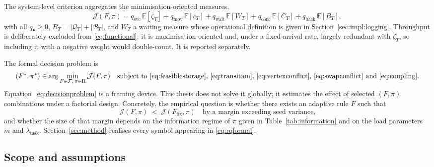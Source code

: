 \documentclass[../main.tex]{subfiles}
\begin{document}
The system-level criterion aggregates the minimisation-oriented measures,
\begin{equation}
  \mathcal{J}(F,\pi) = q_{\mathrm{svc}}\, \mathbb{E}[\bar{\zeta}_T]
                     + q_{\mathrm{mov}}\, \mathbb{E}[\bar{c}_T]
                     + q_{\mathrm{wait}}\, \mathbb{E}[W_T]
                     + q_{\mathrm{conc}}\, \mathbb{E}[C_T]
                     + q_{\mathrm{back}}\, \mathbb{E}[B_T],
  \label{eq:functional}
\end{equation}
with all $q_\bullet \ge 0$, $B_T = |\mathcal{Q}_T| + |\mathcal{B}_T|$, and $W_T$
a waiting measure whose operational definition is given in
Section~\ref{sec:impl:logging}. Throughput is deliberately excluded from
\eqref{eq:functional}: it is maximisation-oriented and, under a fixed arrival
rate, largely redundant with $\bar{\zeta}_T$, so including it with a negative
weight would double-count. It is reported separately.

The formal decision problem is
\begin{equation}
  (F^{\star}, \pi^{\star}) \in
  \arg\min_{F \in \mathcal{F},\, \pi \in \Pi} \mathcal{J}(F,\pi)
  \quad \text{subject to \eqref{eq:feasiblestorage}, \eqref{eq:transition},
  \eqref{eq:vertexconflict}, \eqref{eq:swapconflict} and \eqref{eq:coupling}.}
  \label{eq:decisionproblem}
\end{equation}
Equation~\eqref{eq:decisionproblem} is a framing device. This thesis does not
solve it globally; it estimates the effect of selected $(F,\pi)$ combinations
under a factorial design. Concretely, the empirical question is whether there
exists an adaptive rule $F$ such that
\begin{equation}
  \mathcal{J}(F, \pi) \;<\; \mathcal{J}(F_{\mathrm{fix}}, \pi)
  \quad \text{by a margin exceeding seed variance,}
  \label{eq:rqformal}
\end{equation}
and whether the size of that margin depends on the information regime of $\pi$
given in Table~\ref{tab:information} and on the load parameters $m$ and
$\lambda_{\mathrm{task}}$. Section~\ref{sec:method} realises every symbol
appearing in \eqref{eq:rqformal}.

\subsection{Scope and assumptions}
\label{sec:pf:scope}
\end{document}
